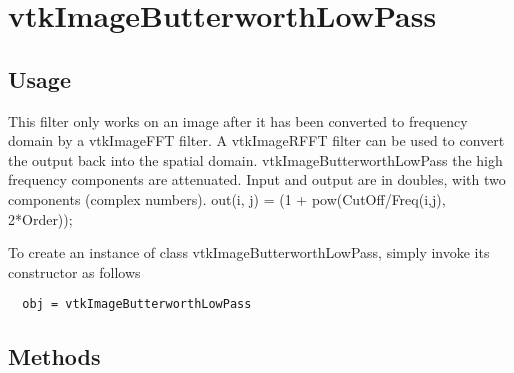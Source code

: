 \section{vtkImageButterworthLowPass}

\subsection{Usage}

 This filter only works on an image after it has been converted to
 frequency domain by a vtkImageFFT filter.  A vtkImageRFFT filter
 can be used to convert the output back into the spatial domain.
 vtkImageButterworthLowPass  the high frequency components are
 attenuated.  Input and output are in doubles, with two components
 (complex numbers).
 out(i, j) = (1 + pow(CutOff/Freq(i,j), 2*Order));

To create an instance of class vtkImageButterworthLowPass, simply
invoke its constructor as follows
\begin{verbatim}
  obj = vtkImageButterworthLowPass
\end{verbatim}
\subsection{Methods}

